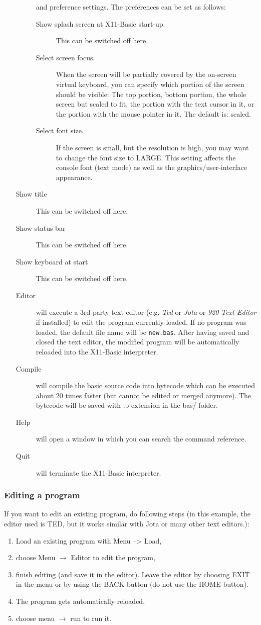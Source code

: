 \begin{itemize}
\begin{description}
and preference settings. The preferences can be set as follows:
\begin{description}
\item[Show splash screen at X11-Basic start-up.] This can be switched off here.
\item[Select screen focus.] When the screen will be partially covered by the 
    on-screen virtual keyboard, you can specify which portion of the screen 
    should be visible: The top portion, bottom portion, the whole screen but 
    scaled to fit, the portion with the text cursor in it, or the portion with 
    the mouse pointer in it. The default is: scaled.
\item[Select font size.] If the screen is small, but the resolution is high, 
you may want to change the font size to LARGE. This setting affects the 
console font (text mode) as well as the graphics/user-interface appearance.
\end{description}
\item[Show title] This can be switched off here.
\item[Show status bar] This can be switched off here.
\item[Show keyboard at start] This can be switched off here.
\item[Editor] will execute a 3rd-party text editor (e.g. {\it Ted} or 
{\it Jota} or {\it 920 Text Editor} if installed) to edit the program currently 
loaded. If no program 
was loaded, the default file name will be \verb|new.bas|. After having saved 
and closed the text editor, the modified program will be automatically 
reloaded into the X11-Basic interpreter.
\item[Compile] will compile the basic source code into bytecode which can be 
executed about 20 times faster (but cannot be edited or merged anymore). 
The bytecode will be saved with .b extension in the bas/ folder.
\item[Help] will open a window in which you can search the command reference.
\item[Quit] will terminate the X11-Basic interpreter.
\end{description}
\end{itemize}

\subsubsection*{Editing a program}
If you want to edit an existing program, do following steps (in this example, the editor used is TED, but it works similar with
Jota or many other text editors.):
\begin{enumerate}
\item Load an existing program with Menu --> Load,
\item choose Menu $\rightarrow$ Editor to edit the program, 
\item finish editing (and save it in the editor). Leave the editor by choosing EXIT in the menu or by using the BACK button (do not use the HOME button).
\item The program gets automatically reloaded, 
\item choose menu $\rightarrow$ run to run it.
\end{enumerate}

